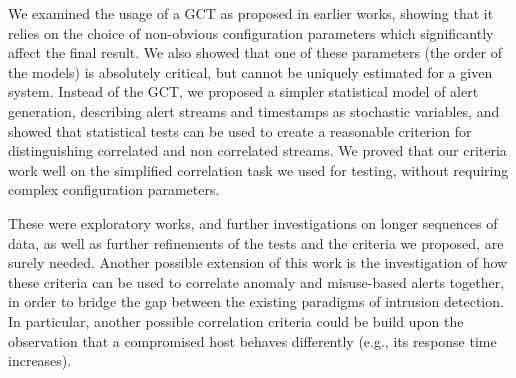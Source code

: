 We examined the usage of a \ac{GCT} as proposed in earlier works, showing that it relies on the choice of non-obvious configuration parameters which significantly affect the final result. We also showed that one of these parameters (the order of the models) is absolutely critical, but cannot be uniquely estimated for a given system. Instead of the \ac{GCT}, we proposed a simpler statistical model of alert generation, describing alert streams and timestamps as stochastic variables, and showed that statistical tests can be used to create a reasonable criterion for distinguishing correlated and non correlated streams. We proved that our criteria work well on the simplified correlation task we used for testing, without requiring complex configuration parameters.

These were exploratory works, and further investigations on longer
sequences of data, as well as further refinements of the tests and the
criteria we proposed, are surely needed. Another possible extension of
this work is the investigation of how these criteria can be used to
correlate anomaly and misuse-based alerts together, in order to bridge
the gap between the existing paradigms of intrusion detection. In
particular, another possible correlation criteria could be build upon
the observation that a compromised host behaves differently (e.g., its
response time increases).

